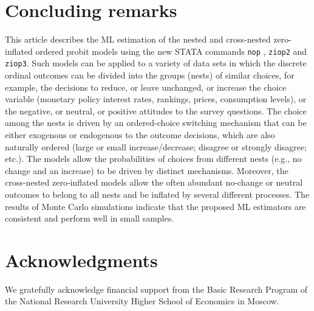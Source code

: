 \documentclass[letterpaper,fleqn,12pt]{article}
\begin{document}
\section{\noindent \noindent Concluding remarks}

This article describes the ML estimation of the nested and cross-nested
zero-inflated ordered probit models using the new STATA commands \texttt{nop}%
, \texttt{ziop2} and \texttt{ziop3}. Such models can be applied to a variety
of data sets in which the discrete ordinal outcomes can be divided into the
groups (nests) of similar choices, for example, the decisions to reduce, or
leave unchanged, or increase the choice variable (monetary policy interest
rates, rankings, prices, consumption levels), or the negative, or neutral,
or positive attitudes to the survey questions. The choice among the nests is
driven by an ordered-choice switching mechanism that can be either exogenous
or endogenous to the outcome decisions, which are also naturally ordered
(large or small increase/decrease; disagree or strongly disagree; etc.). The
models allow the probabilities of choices from different nests (e.g., no
change and an increase) to be driven by distinct mechanisms. Moreover, the
cross-nested zero-inflated models allow the often abundant no-change or
neutral outcomes to belong to all nests and be inflated by several different
processes. The results of Monte Carlo simulations indicate that the proposed
ML estimators are consistent and perform well in small samples.

\section{Acknowledgments}

We gratefully acknowledge financial support from the Basic Research Program
of the National Research University Higher School of Economics in Moscow.

\noindent
\end{document}
